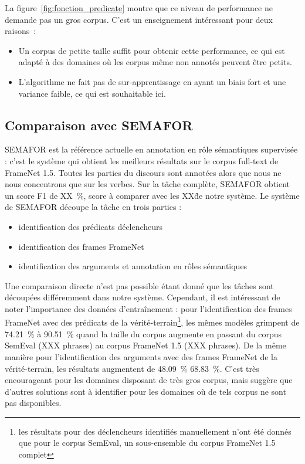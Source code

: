 La figure~\ref{fig:fonction_predicate} montre que ce niveau de performance ne
demande pas un gros corpus. C'est un enseignement intéressant pour deux
raisons~:

\begin{itemize}

    \item Un corpus de petite taille suffit pour obtenir cette performance, ce
    qui est adapté à des domaines où les corpus même non annotés peuvent être
    petits.

    \item L'algorithme ne fait pas de sur-apprentissage en ayant un biais fort
    et une variance faible, ce qui est souhaitable ici.

\end{itemize}

\subsection{Comparaison avec SEMAFOR}

SEMAFOR \citep{das2014frame} est la référence actuelle en annotation en rôle
sémantiques supervisée : c'est le système qui obtient les meilleurs résultats
sur le corpus full-text de FrameNet 1.5. Toutes les parties du discours sont
annotées alors que nous ne nous concentrons que sur les verbes. Sur la tâche
complète, SEMAFOR obtient un score F1 de XX~\%, score à comparer avec les XX\~
de notre système. Le système de SEMAFOR découpe la tâche en trois parties :

\begin{itemize}
    \item identification des prédicats déclencheurs
    \item identification des frames FrameNet
    \item identification des arguments et annotation en rôles sémantiques 
\end{itemize}

Une comparaison directe n'est pas possible étant donné que les tâches sont
découpées différemment dans notre système. Cependant, il est intéressant de
noter l'importance des données d'entraînement : pour l'identification des
frames FrameNet avec des prédicats de la vérité-terrain\footnote{les résultats
pour des déclencheurs identifiés manuellement n'ont été donnés que pour le
corpus SemEval, un sous-ensemble du corpus FrameNet 1.5 complet}, les mêmes
modèles grimpent de 74.21~\% à 90.51~\% quand la taille du corpus augmente en
passant du corpus SemEval (XXX phrases) au corpus FrameNet 1.5 (XXX phrases).
De la même manière pour l'identification des arguments avec des frames FrameNet
de la vérité-terrain, les résultats augmentent de 48.09~\% 68.83~\%. C'est très
encourageant pour les domaines disposant de très gros corpus, mais suggère que
d'autres solutions sont à identifier pour les domaines où de tels corpus ne
sont pas disponibles.

